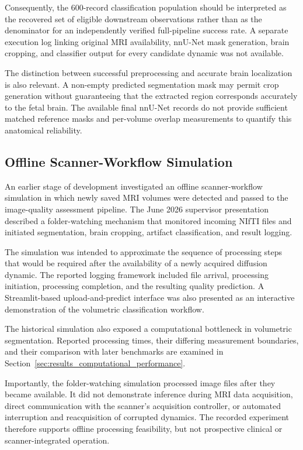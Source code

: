 Consequently, the 600-record classification population should be interpreted as the recovered set of eligible downstream observations rather than as the denominator for an independently verified full-pipeline success rate. A separate execution log linking original MRI availability, nnU-Net mask generation, brain cropping, and classifier output for every candidate dynamic was not available.

The distinction between successful preprocessing and accurate brain localization is also relevant. A non-empty predicted segmentation mask may permit crop generation without guaranteeing that the extracted region corresponds accurately to the fetal brain. The available final nnU-Net records do not provide sufficient matched reference masks and per-volume overlap measurements to quantify this anatomical reliability.

\subsection{Offline Scanner-Workflow Simulation}
\label{subsec:results_3d_offline_simulation}

An earlier stage of development investigated an offline scanner-workflow simulation in which newly saved MRI volumes were detected and passed to the image-quality assessment pipeline. The June 2026 supervisor presentation described a folder-watching mechanism that monitored incoming NIfTI files and initiated segmentation, brain cropping, artifact classification, and result logging.

The simulation was intended to approximate the sequence of processing steps that would be required after the availability of a newly acquired diffusion dynamic. The reported logging framework included file arrival, processing initiation, processing completion, and the resulting quality prediction. A Streamlit-based upload-and-predict interface was also presented as an interactive demonstration of the volumetric classification workflow.

The historical simulation also exposed a computational bottleneck in volumetric segmentation. Reported processing times, their differing measurement boundaries, and their comparison with later benchmarks are examined in Section~\ref{sec:results_computational_performance}.

Importantly, the folder-watching simulation processed image files after they became available. It did not demonstrate inference during MRI data acquisition, direct communication with the scanner's acquisition controller, or automated interruption and reacquisition of corrupted dynamics. The recorded experiment therefore supports offline processing feasibility, but not prospective clinical or scanner-integrated operation.

